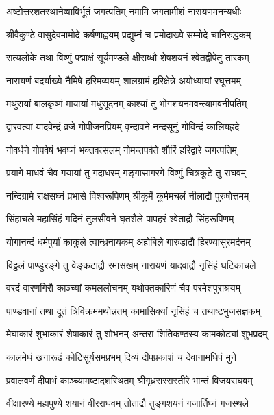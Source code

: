 
\twolineshloka
{अष्टोत्तरशतस्थानेष्वाविर्भूतं जगत्पतिम्}
{नमामि जगतामीशं नारायणमनन्यधीः}

\twolineshloka
{श्रीवैकुण्ठे वासुदेवमामोदे कर्षणाह्वयम्}
{प्रद्युम्नं च प्रमोदाख्ये सम्मोदे चानिरुद्धकम्}

\twolineshloka
{सत्यलोके तथा विष्णुं पद्माक्षं सूर्यमण्डले}
{क्षीराब्धौ शेषशयनं श्वेतद्वीपेतु तारकम्}

\twolineshloka
{नारायणं बदर्याख्ये नैमिषे हरिमव्ययम्}
{शालग्रामं हरिक्षेत्रे अयोध्यायां रघूत्तमम्}

\twolineshloka
{मथुरायां बालकृष्णं मायायां मधुसूदनम्}
{काश्यां तु भोगशयनमवन्त्यामवनीपतिम्}

\twolineshloka
{द्वारवत्यां यादवेन्द्रं व्रजे गोपीजनप्रियम्}
{वृन्दावने नन्दसूनुं गोविन्दं कालियह्रदे}

\twolineshloka
{गोवर्धने गोपवेषं भवघ्नं भक्तवत्सलम्}
{गोमन्तपर्वते शौरिं हरिद्वारे जगत्पतिम्}

\twolineshloka
{प्रयागे माधवं चैव गयायां तु गदाधरम्}
{गङ्गासागरगे विष्णुं चित्रकूटे तु राघवम्}

\twolineshloka
{नन्दिग्रामे राक्षसघ्नं प्रभासे विश्वरूपिणम्}
{श्रीकूर्मे कूर्ममचलं नीलाद्रौ पुरुषोत्तमम्}

\twolineshloka
{सिंहाचले महासिंहं गदिनं तुलसीवने}
{घृतशैले पापहरं श्वेताद्रौ सिंहरूपिणम्}

\twolineshloka
{योगानन्दं धर्मपुर्यां काकुले त्वान्ध्रनायकम्}
{अहोबिले गारुडाद्रौ हिरण्यासुरमर्दनम्}

\twolineshloka
{विट्ठलं पाण्डुरङ्गे तु वेङ्कटाद्रौ रमासखम्}
{नारायणं यादवाद्रौ नृसिंहं घटिकाचले}

\twolineshloka
{वरदं वारणगिरौ काञ्च्यां कमललोचनम्}
{यथोक्तकारिणं चैव परमेशपुराश्रयम्}

\twolineshloka
{पाण्डवानां तथा दूतं त्रिविक्रममथोन्नतम्}
{कामासिक्यां नृसिंहं च तथाष्टभुजसज्ञकम्}

\twolineshloka
{मेघाकारं शुभाकारं शेषाकारं तु शोभनम्}
{अन्तरा शितिकण्ठस्य कामकोट्यां शुभप्रदम्}

\twolineshloka
{कालमेघं खगारूढं कोटिसूर्यसमप्रभम्}
{दिव्यं दीपप्रकाशं च देवानामधिपं मुने}

\twolineshloka
{प्रवालवर्णं दीपाभं काञ्च्यामष्टादशस्थितम्}
{श्रीगृध्रसरसस्तीरे भान्तं विजयराघवम्}

\twolineshloka
{वीक्षारण्ये महापुण्ये शयानं वीरराघवम्}
{तोताद्रौ तुङ्गशयनं गजार्तिघ्नं गजस्थले}

